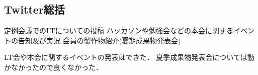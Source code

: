 \subsection*{Twitter総括}

定例会議でのLTについての投稿
ハッカソンや勉強会などの本会に関するイベントの告知及び実況
会員の製作物紹介(夏期成果物発表会) 

LT会や本会に関するイベントの発表はできた．
夏季成果物発表会については動かなかったので良くなかった．